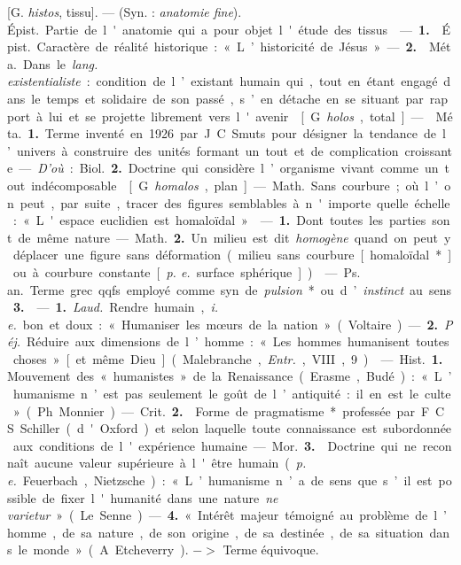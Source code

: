 \begin{itemize}[leftmargin=1cm, label=, itemsep=1pt]
 [G. {\it histos}, tissu]. — (Syn. : {\it anatomie fine}).
\si{Épist.} Partie de l'anatomie qui a pour objet l'étude des tissus.

 — {\bf 1.}  \si{Épist.} Caractère de
réalité historique : « L’historicité de
Jésus ». — {\bf 2.}  \si{Méta.} Dans le {\it lang.
existentialiste} : condition de l’existant humain qui, tout en étant
engagé dans le temps et solidaire de son passé, s’en détache en se
% 
situant par rapport à lui et se projette librement vers l'avenir.

 [G. {\it holos}, total]. —  \si{Méta.} {\bf 1.} Terme
inventé en 1926 par J. C. Smuts pour désigner la tendance de l’univers à
construire des unités formant un tout et de complication croissante.
— {\it D'où} : \si{Biol.} {\bf 2.} Doctrine qui considère l’organisme vivant
comme un tout indécomposable.

 [G. {\it homalos}, plan]. — \si{Math.} Sans courbure; où l’on
peut, par suite, tracer des figures semblables à n'importe quelle échelle :
« L'espace euclidien est homaloïdal ».

 — {\bf 1.} Dont toutes les parties sont de même nature.

— \si{Math.} {\bf 2.} Un milieu est dit {\it homogène} quand on peut y
déplacer une figure sans déformation (milieu sans courbure [homaloïdal*] ou
à courbure constante [{\it p. e.} surface sphérique]).

 — \si{Ps. an.} Terme grec qqfs. employé comme syn. de
{\it pulsion}* ou d’{\it instinct} au sens {\bf 3.}

 — {\bf 1.} {\it Laud.} Rendre humain, {\it i. e.} bon et
doux : « Humaniser les mœurs de la nation » (Voltaire). — {\bf 2.} {\it Péj.}
Réduire aux dimensions de l’homme : « Les hommes humanisent toutes
choses » [et même Dieu] (Malebranche, {\it Entr.}, VIII, 9).

 — \si{Hist.} {\bf 1.} Mouvement des « humanistes » de la
Renaissance (Erasme, Budé) : « L’humanisme n’est pas seulement le goût de
l’antiquité : il en est le culte » (Ph. Monnier).

— \si{Crit.} {\bf 2.}  Forme de pragmatisme* professée par
F. C. S. Schiller (d'Oxford) et selon laquelle toute
connaissance est subordonnée aux conditions de l'expérience humaine.

— \si{Mor.} {\bf 3.}  Doctrine qui ne reconnaît aucune valeur
supérieure à l'être humain ({\it p. e.} Feuerbach, Nietzsche) : « L’humanisme
n’a de sens que s’il est possible de fixer l'humanité dans une nature {\it ne
varietur} » (Le Senne). — {\bf 4.} « Intérêt majeur témoigné au problème de
l’homme, de sa nature, de son origine, de sa destinée, de sa situation dans
le monde » (A. Etcheverry). $->$ Terme équivoque.


\end{itemize}
